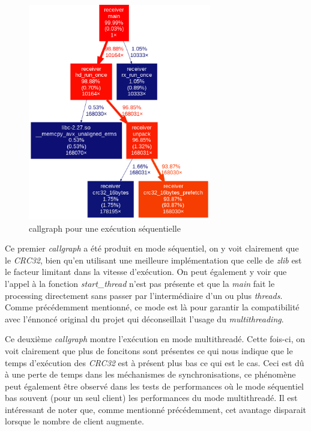 \documentclass[../main.tex]{subfiles}
\begin{document}
\begin{figure}
    \includegraphics[width=8cm]{assets/callgraph_seq.png}
    \caption{callgraph pour une exécution séquentielle}
    \label{sec:graph_seq}
\end{figure}

Ce premier \textit{callgraph} a été produit en mode séquentiel, on y voit clairement que le \textit{CRC32}, bien qu'en utilisant une meilleure implémentation
que celle de \textit{zlib} est le facteur limitant dans la vitesse d'exécution. On peut également y voir que l'appel à la fonction \textit{start\_thread}
n'est pas présente et que la \textit{main} fait le processing directement sans passer par l'intermédiaire d'un ou plus \textit{threads}. Comme précédemment
mentionné, ce mode est là pour garantir la compatibilité avec l'énnoncé original du projet qui déconseillait l'usage du \textit{multithreading}.

\newpage

Ce deuxième \textit{callgraph} montre l'exécution en mode multithreadé. Cette fois-ci, on voit clairement que plus de foncitons sont présentes ce qui nous
indique que le temps d'exécution des \textit{CRC32} est à présent plus bas ce qui est le cas. Ceci est dû à une perte de temps dans les méchanismes de
synchronisations, ce phénomène peut également être observé dans les tests de performances où le mode séquentiel bas souvent (pour un seul client) les
performances du mode multithreadé. Il est intéressant de noter que, comme mentionné précédemment, cet avantage disparait lorsque le nombre de client
augmente.
\end{document}
